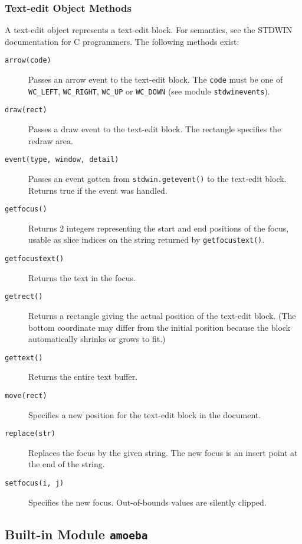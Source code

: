 \subsubsection{Text-edit Object Methods}

A text-edit object represents a text-edit block.
For semantics, see the STDWIN documentation for C programmers.
The following methods exist:
\begin{description}
\item[{\tt arrow(code)}]
Passes an arrow event to the text-edit block.
The
{\tt code}
must be one of
{\tt WC\_LEFT},
{\tt WC\_RIGHT},
{\tt WC\_UP}
or
{\tt WC\_DOWN}
(see module
{\tt stdwinevents}).
\item[{\tt draw(rect)}]
Passes a draw event to the text-edit block.
The rectangle specifies the redraw area.
\item[{\tt event(type, window, detail)}]
Passes an event gotten from
{\tt stdwin.getevent()}
to the text-edit block.
Returns true if the event was handled.
\item[{\tt getfocus()}]
Returns 2 integers representing the start and end positions of the
focus, usable as slice indices on the string returned by
{\tt getfocustext()}.
\item[{\tt getfocustext()}]
Returns the text in the focus.
\item[{\tt getrect()}]
Returns a rectangle giving the actual position of the text-edit block.
(The bottom coordinate may differ from the initial position because
the block automatically shrinks or grows to fit.)
\item[{\tt gettext()}]
Returns the entire text buffer.
\item[{\tt move(rect)}]
Specifies a new position for the text-edit block in the document.
\item[{\tt replace(str)}]
Replaces the focus by the given string.
The new focus is an insert point at the end of the string.
\item[{\tt setfocus(i,~j)}]
Specifies the new focus.
Out-of-bounds values are silently clipped.
\end{description}

\subsection{Built-in Module {\tt amoeba}}

